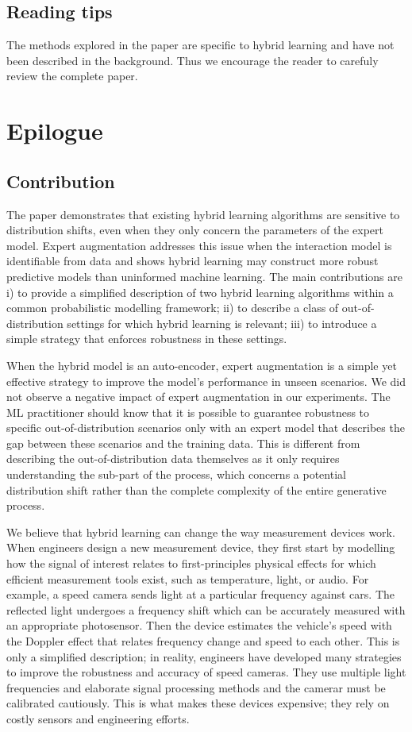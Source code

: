 \subsection{Reading tips}
The methods explored in the paper are specific to hybrid learning and have not been described in the background. Thus we encourage the reader to carefuly review the complete paper.



\section{Epilogue}
\subsection{Contribution}
The paper demonstrates that existing hybrid learning algorithms are sensitive to distribution shifts, even when they only concern the parameters of the expert model. Expert augmentation addresses this issue when the interaction model is identifiable from data and shows hybrid learning may construct more robust predictive models than uninformed machine learning. The main contributions are i) to provide a simplified description of two hybrid learning algorithms within a common probabilistic modelling framework; ii) to describe a class of out-of-distribution settings for which hybrid learning is relevant; iii) to introduce a simple strategy that enforces robustness in these settings.

When the hybrid model is an auto-encoder, expert augmentation is a simple yet effective strategy to improve the model's performance in unseen scenarios. We did not observe a negative impact of expert augmentation in our experiments. The ML practitioner should know that it is possible to guarantee robustness to specific out-of-distribution scenarios only with an expert model that describes the gap between these scenarios and the training data. This is different from describing the out-of-distribution data themselves as it only requires understanding the sub-part of the process, which concerns a potential distribution shift rather than the complete complexity of the entire generative process.

We believe that hybrid learning can change the way measurement devices work. When engineers design a new measurement device, they first start by modelling how the signal of interest relates to first-principles physical effects for which efficient measurement tools exist, such as temperature, light, or audio. For example, a speed camera sends light at a particular frequency against cars. The reflected light undergoes a frequency shift which can be accurately measured with an appropriate photosensor. Then the device estimates the vehicle's speed with the Doppler effect that relates frequency change and speed to each other. This is only a simplified description; in reality, engineers have developed many strategies to improve the robustness and accuracy of speed cameras. They use multiple light frequencies and elaborate signal processing methods and the camerar must be calibrated cautiously. This is what makes these devices expensive; they rely on costly sensors and engineering efforts.

